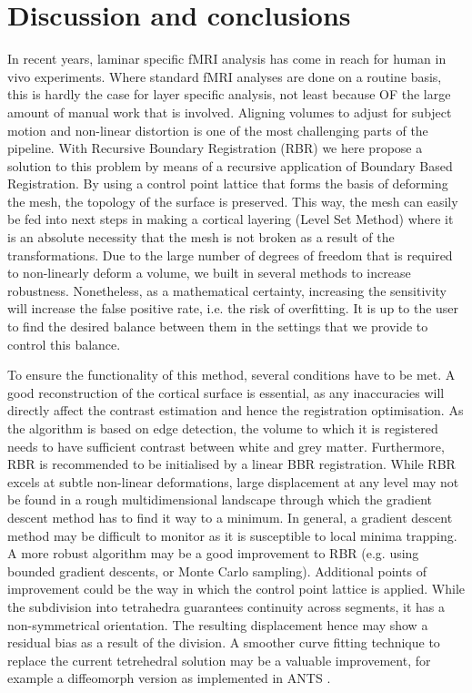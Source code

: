 \section*{Discussion and conclusions}
In recent years, laminar specific fMRI analysis has come in reach for human in vivo experiments. Where standard fMRI analyses are done on a routine basis, this is hardly the case for layer specific analysis, not least because OF the large amount of manual work that is involved. Aligning volumes to adjust for subject motion and non-linear distortion is one of the most challenging parts of the pipeline. With Recursive Boundary Registration (RBR) we here propose a solution to this problem by means of a recursive application of Boundary Based Registration. By using a control point lattice that forms the basis of deforming the mesh, the topology of the surface is preserved. This way, the mesh can easily be fed into next steps in making a cortical layering (Level Set Method) where it is an absolute necessity that the mesh is not broken as a result of the transformations. Due to the large number of degrees of freedom that is required to non-linearly deform a volume, we built in several methods to increase robustness. Nonetheless, as a mathematical certainty, increasing the sensitivity will increase the false positive rate, i.e. the risk of overfitting. It is up to the user to find the desired balance between them in the settings that we provide to control this balance. 

To ensure the functionality of this method, several conditions have to be met. A good reconstruction of the cortical surface is essential, as any inaccuracies will directly affect the contrast estimation and hence the registration optimisation. As the algorithm is based on edge detection, the volume to which it is registered needs to have sufficient contrast between white and grey matter. Furthermore, RBR is recommended to be initialised by a linear BBR registration. While RBR excels at subtle non-linear deformations, large displacement at any level may not be found in a rough multidimensional landscape through which the gradient descent method has to find it way to a minimum. In general, a gradient descent method may be difficult to monitor as it is susceptible to local minima trapping. A more robust algorithm may be a good improvement to RBR (e.g. using bounded gradient descents, or Monte Carlo sampling). Additional points of improvement could be the way in which the control point lattice is applied. While the subdivision into tetrahedra guarantees continuity across segments, it has a non-symmetrical orientation. The resulting displacement hence may show a residual bias as a result of the division. A smoother curve fitting technique to replace the current tetrehedral solution may be a valuable improvement, for example a diffeomorph version as implemented in ANTS \citep{Avants2011}. 

